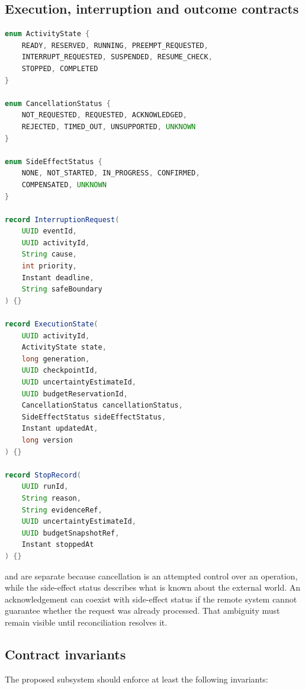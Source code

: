 \subsection{Execution, interruption and outcome contracts}

\begin{lstlisting}[language=Java,caption={Execution records distinguish interruption requests from external cancellation results}]
enum ActivityState {
    READY, RESERVED, RUNNING, PREEMPT_REQUESTED,
    INTERRUPT_REQUESTED, SUSPENDED, RESUME_CHECK,
    STOPPED, COMPLETED
}

enum CancellationStatus {
    NOT_REQUESTED, REQUESTED, ACKNOWLEDGED,
    REJECTED, TIMED_OUT, UNSUPPORTED, UNKNOWN
}

enum SideEffectStatus {
    NONE, NOT_STARTED, IN_PROGRESS, CONFIRMED,
    COMPENSATED, UNKNOWN
}

record InterruptionRequest(
    UUID eventId,
    UUID activityId,
    String cause,
    int priority,
    Instant deadline,
    String safeBoundary
) {}

record ExecutionState(
    UUID activityId,
    ActivityState state,
    long generation,
    UUID checkpointId,
    UUID uncertaintyEstimateId,
    UUID budgetReservationId,
    CancellationStatus cancellationStatus,
    SideEffectStatus sideEffectStatus,
    Instant updatedAt,
    long version
) {}

record StopRecord(
    UUID runId,
    String reason,
    String evidenceRef,
    UUID uncertaintyEstimateId,
    UUID budgetSnapshotRef,
    Instant stoppedAt
) {}
\end{lstlisting}

\texttt{} and \texttt{} are separate because cancellation is an attempted control over an operation, while the side-effect status describes what is known about the external world. An acknowledgement can coexist with \texttt{} side-effect status if the remote system cannot guarantee whether the request was already processed. That ambiguity must remain visible until reconciliation resolves it.

\subsection{Contract invariants}
\label{sec:ch16-contract-invariants}

The proposed subsystem should enforce at least the following invariants:

